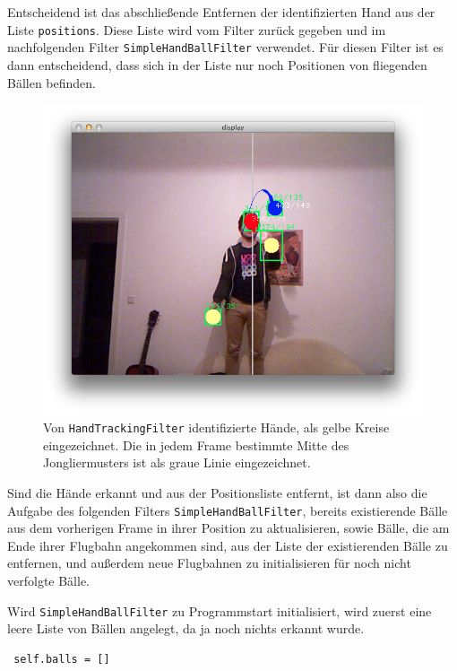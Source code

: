 \documentclass[12pt,a4paper,ngerman]{scrartcl}
\begin{document}
Entscheidend ist das abschließende Entfernen der identifizierten Hand aus der
Liste \lstinline{positions}. Diese Liste wird vom Filter zurück gegeben und im
nachfolgenden Filter \lstinline{SimpleHandBallFilter} verwendet. Für diesen Filter
ist es dann entscheidend, dass sich in der Liste nur noch Positionen von fliegenden
Bällen befinden.


\begin{figure}[H]
    \centering
    \includegraphics[scale=0.45]{img/handtracking-2.png}
    \vspace{-0.5cm}
    \caption{Von \lstinline{HandTrackingFilter} identifizierte Hände, als gelbe Kreise eingezeichnet. Die in jedem Frame bestimmte Mitte des Jongliermusters ist als graue Linie eingezeichnet.}
    \label{rects-1}
\end{figure}

Sind die Hände erkannt und aus der Positionsliste entfernt, ist dann also die
Aufgabe des folgenden Filters \lstinline{SimpleHandBallFilter}, bereits existierende Bälle aus dem vorherigen Frame in ihrer Position zu aktualisieren, sowie Bälle, die am Ende ihrer Flugbahn angekommen sind, aus der Liste der existierenden Bälle zu entfernen, und außerdem neue Flugbahnen zu initialisieren für noch nicht verfolgte Bälle.

Wird \lstinline{SimpleHandBallFilter} zu Programmstart initialisiert, wird zuerst eine leere Liste von Bällen angelegt, da ja noch nichts erkannt wurde.

\begin{lstlisting}
 self.balls = []
\end{lstlisting}
\end{document}
